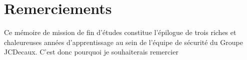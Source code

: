 
\chapter*{Remerciements}
Ce mémoire de mission de fin d'études constitue l'épilogue de trois riches et chaleureuses années d'apprentissage au sein de l'équipe de
sécurité du Groupe JCDecaux. C'est donc pourquoi je souhaiterais remercier 